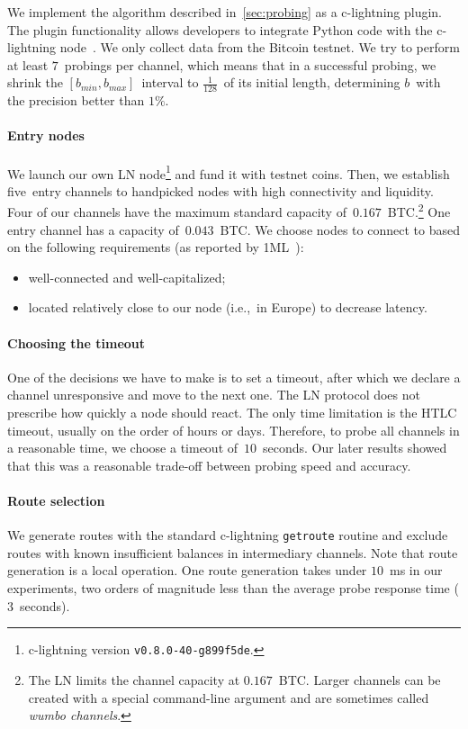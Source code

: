 We implement the algorithm described in~\cref{sec:probing} as a c-lightning plugin.
The plugin functionality allows developers to integrate Python code with the c-lightning node~\cite{clightningPlugins}.
We only collect data from the Bitcoin testnet.
We try to perform at least $7$~probings per channel, which means that in a successful probing, we shrink the $[b_{min}, b_{max}]$~interval to $\frac{1}{128}$~of its initial length, determining $b$~with the precision better than $1\%$.

\paragraph{Entry nodes}
We launch our own LN node\footnote{c-lightning version \texttt{v0.8.0-40-g899f5de}.} and fund it with testnet coins.
Then, we establish five~entry channels to handpicked nodes with high connectivity and liquidity.
Four of our channels have the maximum standard capacity of~$0.167$~BTC\@.\footnote{The LN limits the channel capacity at $0.167$~BTC\@. Larger channels can be created with a special command-line argument and are sometimes called \textit{wumbo channels}.}
One entry channel has a capacity of~$0.043$~BTC\@.
We choose nodes to connect to based on the following requirements (as reported by 1ML~\cite{1MLTopConnected}):
\begin{itemize}
	\item well-connected and well-capitalized;
	\item located relatively close to our node (i.e.,~in Europe) to decrease latency.
\end{itemize}

\paragraph{Choosing the timeout}
One of the decisions we have to make is to set a timeout, after which we declare a channel unresponsive and move to the next one.
The LN protocol does not prescribe how quickly a node should react.
The only time limitation is the HTLC timeout, usually on the order of hours or days.
Therefore, to probe all channels in a reasonable time, we choose a timeout of~$10$~seconds.
Our later results showed that this was a reasonable trade-off between probing speed and accuracy.

\paragraph{Route selection}
We generate routes with the standard c-lightning \texttt{getroute} routine and exclude routes with known insufficient balances in intermediary channels.
Note that route generation is a local operation.
One route generation takes under $10$~ms in our experiments, two orders of magnitude less than the average probe response time ($3$~seconds).

